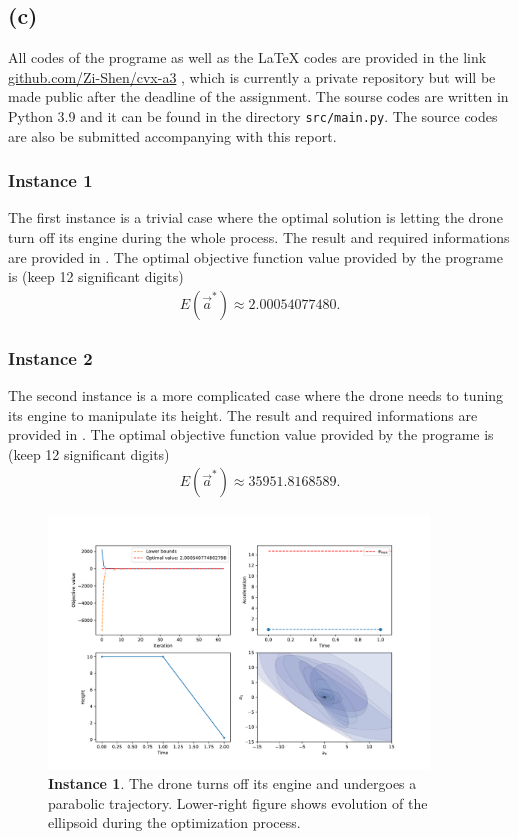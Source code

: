 \documentclass[letterpaper,10pt]{article}
\begin{document}
\subsection{(c)}

All codes of the programe as well as the LaTeX codes are provided in the link \href{https://github.com/Zi-Shen/cvx-a3}{github.com/Zi-Shen/cvx-a3}
, which is currently a private repository but will be made public after the deadline of the assignment. The sourse codes are written in Python 3.9 and it can be found in the directory \texttt{src/main.py}. The source codes are also be submitted accompanying with this report.

\subsubsection*{Instance 1}

The first instance is a trivial case where the optimal solution is letting the drone turn off its engine during the whole process. The result and required informations are provided in .
The optimal objective function value provided by the programe is (keep 12 significant digits)
\begin{align}
    E(\vec a^*)\approx 2.00054077480.
\end{align}

\subsubsection*{Instance 2}

The second instance is a more complicated case where the drone needs to tuning its engine to manipulate its height. 
The result and required informations are provided in .
The optimal objective function value provided by the programe is (keep 12 significant digits)
\begin{align}
    E(\vec a^*)\approx 35951.8168589.
\end{align}

\begin{figure}
    \centering
    \includegraphics[width=0.9\textwidth]{fig/Figure_1.pdf}
    \caption{\textbf{Instance 1}. The drone turns off its engine and undergoes a parabolic trajectory. Lower-right figure shows evolution of the ellipsoid during the optimization process.}
    \label{fig:instance1}
\end{figure}
\end{document}
